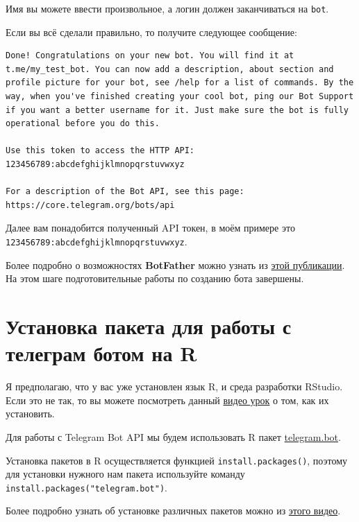 \documentclass[
]{book}
\begin{document}
Имя вы можете ввести произвольное, а логин должен заканчиваться на \texttt{bot}.

Если вы всё сделали правильно, то получите следующее сообщение:

\begin{verbatim}
Done! Congratulations on your new bot. You will find it at t.me/my_test_bot. You can now add a description, about section and profile picture for your bot, see /help for a list of commands. By the way, when you've finished creating your cool bot, ping our Bot Support if you want a better username for it. Just make sure the bot is fully operational before you do this.

Use this token to access the HTTP API:
123456789:abcdefghijklmnopqrstuvwxyz

For a description of the Bot API, see this page: https://core.telegram.org/bots/api
\end{verbatim}

Далее вам понадобится полученный API токен, в моём примере это \texttt{123456789:abcdefghijklmnopqrstuvwxyz}.

Более подробно о возможностях \textbf{BotFather} можно узнать из \href{https://botcreators.ru/blog/botfather-instrukciya/}{этой публикации}. На этом шаге подготовительные работы по созданию бота завершены.

\section{Установка пакета для работы с телеграм ботом на R}\label{ux443ux441ux442ux430ux43dux43eux432ux43aux430-ux43fux430ux43aux435ux442ux430-ux434ux43bux44f-ux440ux430ux431ux43eux442ux44b-ux441-ux442ux435ux43bux435ux433ux440ux430ux43c-ux431ux43eux442ux43eux43c-ux43dux430-r}

Я предполагаю, что у вас уже установлен язык R, и среда разработки RStudio. Если это не так, то вы можете посмотреть данный \href{https://youtu.be/wFUoaeGEMmY}{видео урок} о том, как их установить.

Для работы с Telegram Bot API мы будем использовать R пакет \href{https://CRAN.R-project.org/package=telegram.bot}{telegram.bot}.

Установка пакетов в R осуществляется функцией \texttt{install.packages()}, поэтому для установки нужного нам пакета используйте команду \texttt{install.packages("telegram.bot")}.

Более подробно узнать об установке различных пакетов можно из \href{https://youtu.be/1UvrWoZugic}{этого видео}.
\end{document}
